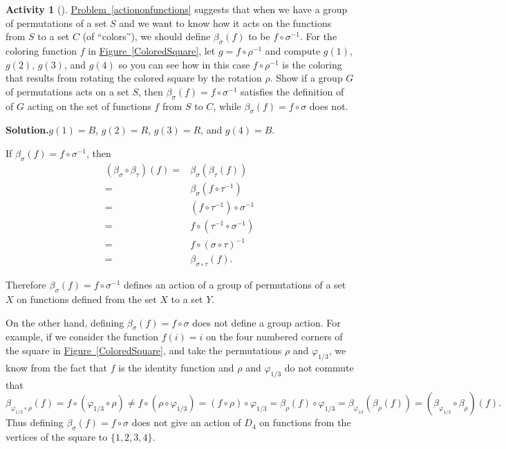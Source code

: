 \documentclass[10pt,]{book}
\theoremstyle{plain}
\theoremstyle{definition}
\newtheorem{activity}[project]{Activity}
\numberwithin{equation}{chapter}
\newcommand{\amp}{&}
\begin{document}
\begin{activity}[]\label{actingonfunctions2}
\hyperref[actiononfunctions]{Problem~\ref{actiononfunctions}} suggests that when we have a group of permutations of a set \(S\) and we want to know how it acts on the functions from \(S\) to a set \(C\) (of ``colors''), we should define \(\beta_{\sigma}(f)\) to be \(f\circ\sigma^{-1}\). For the coloring function \(f\) in \hyperref[ColoredSquare]{Figure~\ref{ColoredSquare}}, let \(g=f\circ\rho^{-1}\) and compute \(g(1)\), \(g(2)\), \(g(3)\), and \(g(4)\) so you can see how in this case \(f\circ\rho^{-1}\) is the coloring that results from rotating the colored square by the rotation \(\rho\). Show if a group \(G\) of permutations acts on a set \(S\), then \(\beta_{\sigma}(f) =f\circ\sigma^{-1}\) satisfies the definition of of \(G\) acting on the set of functions \(f\) from \(S\) to \(C\), while \(\beta_{\sigma}(f) =f\circ\sigma\) does not.%
\par\medskip\noindent%
\textbf{Solution.}\quad \(g(1)=B\), \(g(2)=R\), \(g(3)=R\), and \(g(4)=B\).%
\par
If \(\beta_{\sigma}(f) = f\circ\sigma^{-1}\), then%
\begin{align*}
(\beta_{\sigma}\circ\beta_{\tau})(f) =\amp \beta_{\sigma}(\beta_{\tau}(f))\\
=\amp
\beta_{\sigma}(f\circ \tau^{-1})\\
=\amp (f\circ\tau^{-1})\circ\sigma^{-1}\\
=\amp
f\circ(\tau^{-1}\circ \sigma^{-1})\\
=\amp  f\circ (\sigma\circ\tau)^{-1}\\
=\amp \beta_{\sigma\circ\tau}(f).
\end{align*}
%
\par
Therefore \(\beta_{\sigma}(f) = f\circ\sigma^{-1}\) defines an action of a group of permutations of a set \(X\) on functions defined from the set \(X\) to a set \(Y\).%
\par
On the other hand, defining \(\beta_{\sigma}(f) = f\circ\sigma\) does not define a group action. For example, if we consider the function \(f(i)=i\) on the four numbered corners of the square in \hyperref[ColoredSquare]{Figure~\ref{ColoredSquare}}, and take the permutations \(\rho\) and \(\varphi_{1/3}\), we know from the fact that \(f\) is the identity function and \(\rho\) and \(\varphi_{1/3}\) do not commute that \(\beta_{\varphi_{1/3}\circ\rho}(f) = f\circ(\varphi_{1/3}\circ\rho)\not =
f\circ(\rho\circ\varphi_{1/3})=(f\circ\rho)\circ\varphi_{1/3}=\beta_{\rho}(f)
\circ\varphi_{1/3}= \beta_{\varphi_{13}}(\beta_\rho(f)) =(\beta_{\varphi_{1/3}}\circ
\beta_{\rho})(f).\) Thus defining \(\beta_\sigma(f)= f\circ \sigma\) does not give an action of \(D_4\) on functions from the vertices of the square to \(\{1,2,3,4\}\).%
\end{activity}
\end{document}
